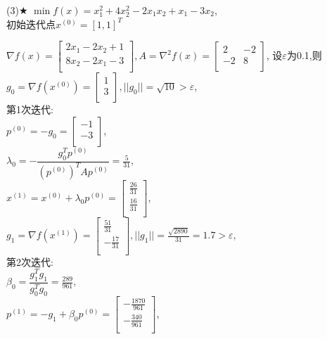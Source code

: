 \begin{problem}{(3)$\bigstar$}
    $\min f(x)=x_1^2+4x_2^2-2x_1x_2+x_1-3x_2$,\\
    初始迭代点${x^{(0)}}=[1,1]^T$
\end{problem}
\begin{solution}
    $\nabla f(x)=\begin{bmatrix}
        2x_1-2x_2+1  \\
        8x_2-2x_1-3  \\
    \end{bmatrix}, A=\nabla^2 f(x)=\begin{bmatrix}
        2   & -2  \\
        -2  & 8  \\
    \end{bmatrix}$,
    设$\varepsilon$为0.1,则\\
    $g_0=\nabla f(x^{(0)})=\begin{bmatrix} 1\\3\\\end{bmatrix},||g_0||=\sqrt{10}>\varepsilon$,\\
    第1次迭代:\\
    $p^{(0)}=-g_0=\begin{bmatrix} -1\\-3\\\end{bmatrix}$,\\
    $\lambda_0=-\dfrac{g_0^Tp^{(0)}}{(p^{(0)})^TAp^{(0)}}=\frac{5}{31}$,\\
    $x^{(1)}=x^{(0)}+\lambda_0p^{(0)}=\begin{bmatrix} \frac{26}{31}\\\frac{16}{31}\\\end{bmatrix}$,\\
    $g_1=\nabla f(x^{(1)})=\begin{bmatrix} \frac{51}{31}\\-\frac{17}{31}\\\end{bmatrix},||g_1||=\frac{\sqrt{2890}}{31}=1.7>\varepsilon$,\\
    第2次迭代:\\
    $\beta_0=\dfrac{g_1^Tg_1}{g_0^Tg_0}=\frac{289}{961}$,\\
    $p^{(1)}=-g_1+\beta_0p^{(0)}=\begin{bmatrix} -\frac{1870}{961}\\-\frac{340}{961}\\\end{bmatrix}$,\\

\end{solution}
